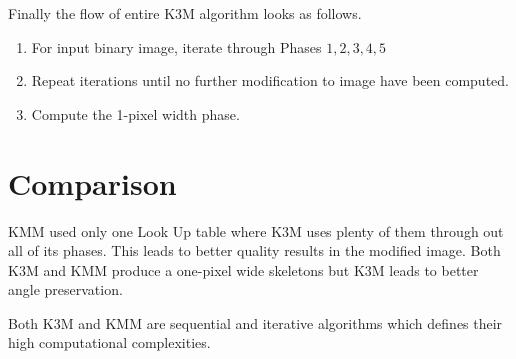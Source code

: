 \documentclass{article}
\begin{document}
Finally the flow of entire K3M algorithm looks as follows.
\begin{enumerate}
	\item For input binary image, iterate through Phases $1,2,3,4,5$
	\item Repeat iterations until no further modification to image have been computed.
	\item Compute the 1-pixel width phase.
\end{enumerate}


\section{Comparison}
KMM used only one Look Up table where K3M uses plenty of them through out all of its phases. This leads to better quality results in the modified image.
Both K3M and KMM produce a one-pixel wide skeletons but K3M leads to better angle preservation.

Both K3M and KMM are sequential and iterative algorithms which defines their high computational complexities.
\end{document}
